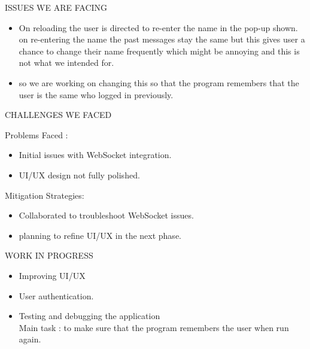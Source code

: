 \documentclass{beamer}
\begin{document}
\begin{frame}{ISSUES WE ARE FACING}
    \begin{itemize}
        \item On reloading the user is directed to re-enter the name in the pop-up shown. \\
        on re-entering the name the past messages stay the same but this gives user a chance to change their name frequently which might be annoying and this is not what we intended for.
        
        \item so we are working on changing this so that the program remembers that the user is the same who logged in previously.
    \end{itemize}
\end{frame}

\begin{frame}{CHALLENGES WE FACED}
    \begin{block}{Problems Faced :}
        \begin{itemize}
            \item Initial issues with WebSocket integration.
            \item UI/UX design not fully polished. 
        \end{itemize}
    \end{block}
    
    \begin{block}{Mitigation Strategies: }
        \begin{itemize}
            \item Collaborated to troubleshoot WebSocket issues.
            \item planning to refine UI/UX in the next phase.
        \end{itemize}
    \end{block}
\end{frame}

\begin{frame}{WORK IN PROGRESS}
    \begin{itemize}
        \item Improving UI/UX
        \item User authentication.
        \item Testing and debugging the application
        \\
        Main task : to make sure that the program remembers the user when run again.
    \end{itemize}
\end{frame}
\end{document}
